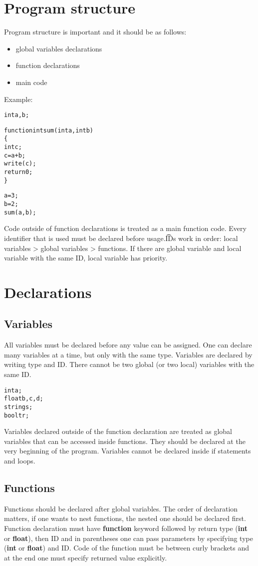 \documentclass{ol-softwaremanual}
\begin{document}
\section{Program structure}

Program structure is important and it should be as follows:
\begin{itemize}
    \item global variables declarations
    \item function declarations
    \item main code
\end{itemize}

Example:
\begin{alltt}
int a, b;

function int sum(int a, int b)
\{
    int c;
    c = a + b;
    write(c);
    return 0;
\}

a = 3;
b = 2;
sum(a, b);
\end{alltt}

Code outside of function declarations is treated as a main function code. Every identifier that is used must be declared before usage.\t

IDs work in order: local variables > global variables > functions. If there are global variable and local variable with the same ID, local variable has priority.

\section{Declarations}

\subsection{Variables}
All variables must be declared before any value can be assigned. One can declare many variables at a time, but only with the same type. Variables are declared by writing type and ID. There cannot be two global (or two local) variables with the same ID.
\begin{alltt}
int a;
float b, c, d;
string s;
bool tr;
\end{alltt}
Variables declared outside of the function declaration are treated as global variables that can be accessed inside functions. They should be declared at the very beginning of the program. Variables cannot be declared inside if statements and loops.

\subsection{Functions}
Functions should be declared after global variables. The order of declaration matters, if one wants to nest functions, the nested one should be declared first. Function declaration must have \textbf{function} keyword followed by return type (\textbf{int} or \textbf{float}), then ID and in parentheses one can pass parameters by specifying type (\textbf{int} or \textbf{float}) and ID. Code of the function must be between curly brackets and at the end one must specify returned value explicitly.
\end{document}
